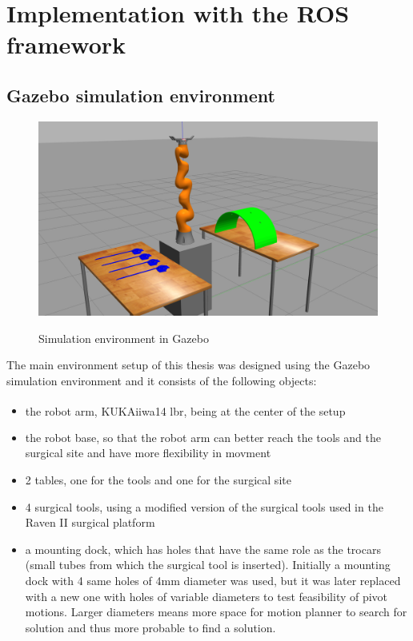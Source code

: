 \section{Implementation with the ROS framework}

\subsection{Gazebo simulation environment}

\begin{center}
\begin{figure}[H]
\centering
\includegraphics[width=12cm]{images/gazebo-sim1.png}\\
\caption{Simulation environment in Gazebo}
\end{figure}
\end{center}

The main environment setup of this thesis was designed using the Gazebo simulation environment and 
it consists of the following objects:
\begin{itemize}
\item the robot arm, KUKA\textsuperscript \textregistered iiwa14 lbr, being at the center of the setup
\item the robot base, so that the robot arm can better reach the tools and the surgical site and have more flexibility in movment
\item 2 tables, one for the tools and one for the surgical site
\item 4 surgical tools, using a modified version of the surgical tools used in the Raven II surgical platform
\item a mounting dock, which has holes that have the same role as the trocars (small tubes from 
which the surgical tool is inserted). Initially a mounting dock with 4 same holes of 4mm diameter was used, but it was later replaced with a new one with holes of variable diameters to test feasibility of pivot motions. Larger diameters means more space for motion planner to search for solution and thus more probable to find a solution.
\end{itemize}


